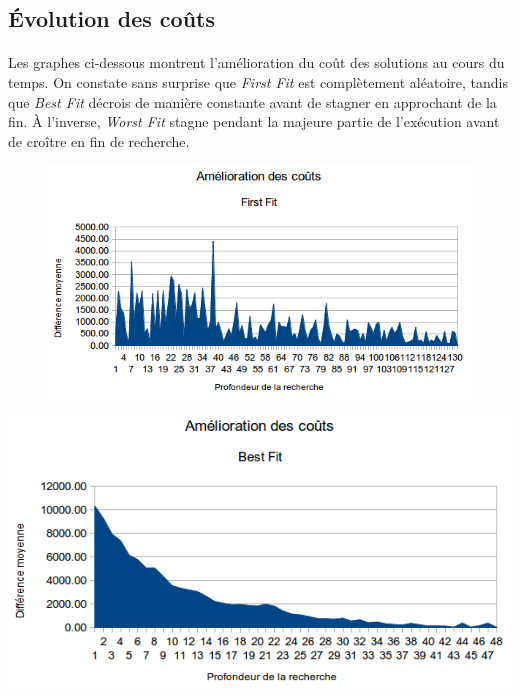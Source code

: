 \documentclass[a4paper,10pt]{report}
\begin{document}
\subsection{Évolution des coûts}

\paragraph{}
Les graphes ci-dessous montrent l'amélioration du coût des solutions au cours
du temps. On constate sans surprise que \textit{First Fit} est complètement
aléatoire, tandis que \textit{Best Fit} décrois de manière constante avant de
stagner en approchant de la fin. À l'inverse, \textit{Worst Fit} stagne pendant
la majeure partie de l'exécution avant de croître en fin de recherche.

\begin{figure}[h]
  \begin{center}
    \includegraphics[width=\textwidth]{images/att48-cost-first-fit.png}
  \end{center}
\end{figure}


\begin{center}
  \includegraphics[width=\textwidth]{images/att48-cost-best-fit.png}
\end{center}
\end{document}
